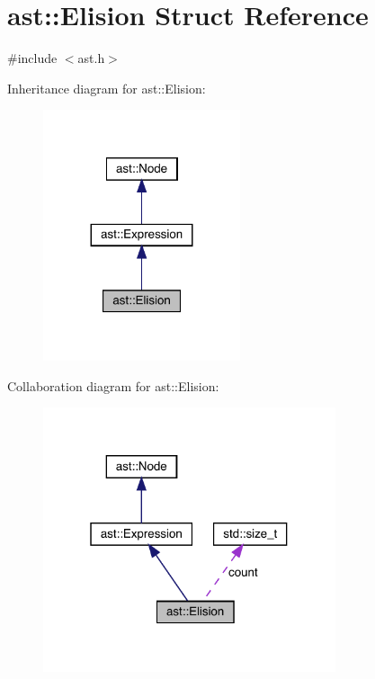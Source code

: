 \hypertarget{structast_1_1_elision}{}\section{ast\+:\+:Elision Struct Reference}
\label{structast_1_1_elision}


{\ttfamily \#include $<$ast.\+h$>$}



Inheritance diagram for ast\+:\+:Elision\+:\nopagebreak
\begin{figure}[H]
\begin{center}
\leavevmode
\includegraphics[width=164pt]{structast_1_1_elision__inherit__graph}
\end{center}
\end{figure}


Collaboration diagram for ast\+:\+:Elision\+:\nopagebreak
\begin{figure}[H]
\begin{center}
\leavevmode
\includegraphics[width=244pt]{structast_1_1_elision__coll__graph}
\end{center}
\end{figure}
